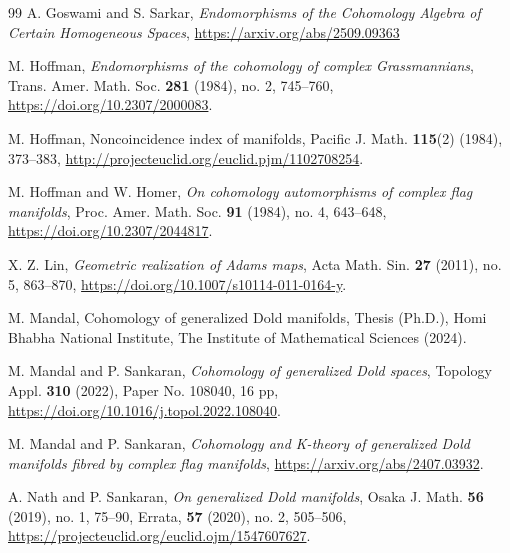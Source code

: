 \documentclass{amsart}
\begin{document}
\begin{thebibliography}{99}
 A. Goswami and S. Sarkar, \textit{Endomorphisms of the Cohomology Algebra of Certain Homogeneous Spaces}, \url{https://arxiv.org/abs/2509.09363}

 M. Hoffman, \textit{Endomorphisms of the cohomology of complex Grassmannians}, Trans. Amer. Math. Soc. \textbf{281} (1984), no. 2, 745--760, \url{https://doi.org/10.2307/2000083}.

 M. Hoffman, Noncoincidence index of manifolds, Pacific J. Math. \textbf{115}(2) (1984), 373--383, \url{http://projecteuclid.org/euclid.pjm/1102708254}.

 M. Hoffman and W. Homer, \textit{On cohomology automorphisms of complex flag manifolds}, Proc. Amer. Math. Soc. \textbf{91} (1984), no. 4, 643--648, \url{https://doi.org/10.2307/2044817}.

    
 X. Z. Lin, \textit{Geometric realization of Adams maps}, Acta Math. Sin. \textbf{27} (2011), no. 5, 863--870, \url{https://doi.org/10.1007/s10114-011-0164-y}.

 M. Mandal, Cohomology of generalized Dold manifolds, Thesis (Ph.D.), Homi Bhabha National Institute, The Institute of Mathematical Sciences (2024).
	
 M. Mandal and P. Sankaran, \textit{Cohomology of generalized Dold spaces}, Topology Appl. \textbf{310} (2022), Paper No. 108040, 16 pp, \url{https://doi.org/10.1016/j.topol.2022.108040}.
    
 M. Mandal and P. Sankaran, \textit{Cohomology and K-theory of generalized Dold manifolds fibred by complex flag manifolds}, \url{https://arxiv.org/abs/2407.03932}.
	
 A. Nath and P. Sankaran, \textit{On generalized Dold manifolds}, Osaka J. Math. \textbf{56} (2019), no. 1, 75--90, Errata, \textbf{57} (2020), no. 2, 505--506, %
\url{https://projecteuclid.org/euclid.ojm/1547607627}.
	

\end{thebibliography}
\end{document}

